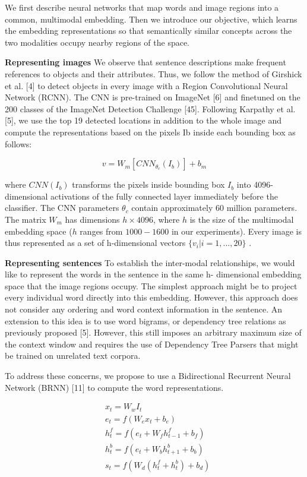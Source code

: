 \documentclass[12pt]{article}%
\begin{document}
We first describe neural networks that map words and image regions into a common, multimodal embedding. Then we introduce our objective, which learns the embedding representations so that semantically similar concepts across the two modalities occupy nearby regions of the space.

{\bf Representing images} We observe that sentence descriptions make frequent references to objects and their attributes. Thus, we follow the method of Girshick et al. [4] to detect objects in every image with a Region Convolutional Neural Network (RCNN). The CNN is pre-trained on ImageNet [6] and finetuned on the 200 classes of the ImageNet Detection Challenge [45]. Following Karpathy et al. [5], we use the top 19 detected locations in addition to the whole image and compute the representations based on the pixels Ib inside each bounding box as follows:

\[v={{W}_{m}}[CN{{N}_{{{\theta }_{c}}}}({{I}_{b}})]+{{b}_{m}}\]

where $CNN(I_b)$ transforms the pixels inside bounding box $I_b$  into 4096-dimensional activations of the fully connected layer immediately before the classifier. The CNN parameters ${\theta }_{c}$ contain approximately 60 million parameters. The matrix $W_m$  has dimensions $h\times 4096$,  where $h$ is the size of the multimodal embedding space ($h$ ranges from $1000- 1600$ in our experiments). Every image is thus represented as a set of h-dimensional vectors $\{{{v}_{i}}|i=1,...,20\}$ .

{\bf Representing sentences}  To establish the inter-modal relationships, we would like to represent the words in the sentence in the same h- dimensional embedding space that the image regions occupy. The simplest approach might be to project every individual word directly into this embedding. However, this approach does not consider any ordering and word context information in the sentence.  An extension to this idea is  to use word bigrams, or dependency tree relations as previously proposed [5]. However, this still imposes an arbitrary maximum size of the context window and requires the use of Dependency Tree Parsers that might be trained on unrelated text corpora.

To address these concerns, we propose to use a Bidirectional Recurrent Neural Network (BRNN) [11] to compute the word representations.

\begin{align}
  & {{x}_{t}}={{W}_{w}}{{I}_{t}} \\ 
 & {{e}_{t}}=f({{W}_{e}}{{x}_{t}}+{{b}_{e}}) \\ 
 & h_{t}^{f}=f({{e}_{t}}+{{W}_{f}}h_{t-1}^{f}+{{b}_{f}}) \\ 
 & h_{t}^{b}=f({{e}_{t}}+{{W}_{b}}h_{t+1}^{b}+{{b}_{b}}) \\ 
 & {{s}_{t}}=f({{W}_{d}}(h_{t}^{f}+h_{t}^{b})+{{b}_{d}}) 
\end{align}
\end{document}

